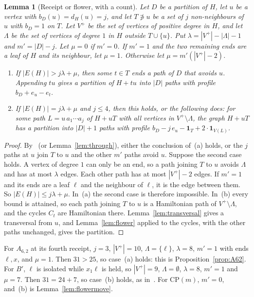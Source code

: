 \documentclass[11pt]{amsart}
\newtheorem{lemma}[theorem]{Lemma}
\theoremstyle{definition}
\begin{document}
\begin{lemma}[Receipt or flower, with a count]\label{lem:rfcount}
Let $D$ be a partition of $H$, let $u$ be a vertex with $b_D(u)=d_H(u)=j$, and let $T\not\ni u$ be a set
of $j$ non-neighbours of $u$ with $b_D=1$ on $T$. Let $V^+$ be the set of vertices of positive degree
in $H$, and let $\Lambda$ be the set of vertices of degree $1$ in $H$ outside $T\cup\{u\}$. Put
$\lambda=|V^+|-|\Lambda|-1$ and $m'=|D|-j$. Let $\mu=0$ if $m'=0$. If $m'=1$ and the two remaining
ends are a leaf of $H$ and its neighbour, let $\mu=1$. Otherwise let $\mu=m'(|V^+|-2)$.
\begin{enumerate}[label=(\alph*)]
\item If $|E(H)|>j\lambda+\mu$, then some $t\in T$ ends a path of $D$ that avoids $u$. Appending $tu$
gives a partition of $H+tu$ into $|D|$ paths with profile $b_D+e_u-e_t$.
\item If $|E(H)|=j\lambda+\mu$ and $j\le4$, then this holds, or the following does: for some path
$L=u\,a_1\cdots a_j$ of $H+uT$ with all vertices in $V^+\setminus\Lambda$, the graph $H+uT$ has a
partition into $|D|+1$ paths with profile $b_D-j\,e_u-\mathbf 1_T+2\cdot\mathbf 1_{V(L)}$.
\end{enumerate}
\end{lemma}
\begin{proof}
By~\cite[Thm.~67]{ES} (or Lemma~\ref{lem:through}), either the conclusion of~(a) holds, or the $j$
paths at $u$ join $T$ to $u$ and the other $m'$ paths avoid $u$. Suppose the second case holds. A
vertex of degree $1$ can only be an end, so a path joining $T$ to $u$ avoids $\Lambda$ and has at
most $\lambda$ edges. Each other path has at most $|V^+|-2$ edges. If $m'=1$ and its ends are a leaf
$\ell$ and the neighbour of $\ell$, it is the edge between them. So $|E(H)|\le j\lambda+\mu$. In~(a)
the second case is therefore impossible. In~(b) every bound is attained, so each path joining $T$
to $u$ is a Hamiltonian path of $V^+\setminus\Lambda$, and the cycles $C_t$ are Hamiltonian there.
Lemma~\ref{lem:transversal} gives a transversal from $u$, and Lemma~\ref{lem:flower} applied to
the cycles, with the other paths unchanged, gives the partition.
\end{proof}

For $A_{6,2}$ at its fourth receipt, $j=3$, $|V^+|=10$, $\Lambda=\{\ell\}$, $\lambda=8$, $m'=1$ with
ends $\ell,x$, and $\mu=1$. Then $31>25$, so case~(a) holds: this is Proposition~\ref{prop:A62}.
For $B'$, $\ell$ is isolated while $x_1\ell$ is held, so $|V^+|=9$, $\Lambda=\emptyset$,
$\lambda=8$, $m'=1$ and $\mu=7$. Then $31=24+7$, so case~(b) holds, as in~\cite[Prop.~68]{ES}. For
$\mathrm{CP}(m)$, $m'=0$, and~(b) is Lemma~\ref{lem:flowermove}.
\end{document}
